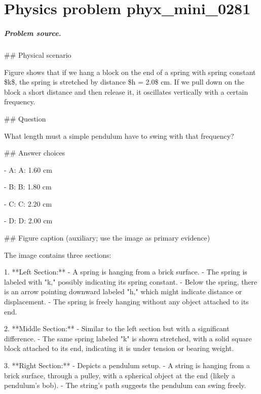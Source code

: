
\chapter{Physics problem phyx\_mini\_0281}
\label{ch:PhyXMiniProblems_problem_phyx_mini_0281}

\paragraph{Problem source.}
\#\# Physical scenario

Figure shows that if we hang a block on the end of a spring with spring constant \$k\$, the spring is stretched by distance \$h = 2.0\$ cm. If we pull down on the block a short distance and then release it, it oscillates vertically with a certain frequency.

\#\# Question

What length must a simple pendulum have to swing with that frequency?

\#\# Answer choices

- A: A: 1.60 cm

- B: B: 1.80 cm

- C: C: 2.20 cm

- D: D: 2.00 cm

\#\# Figure caption (auxiliary; use the image as primary evidence)

The image contains three sections:

1. **Left Section:**
   - A spring is hanging from a brick surface.
   - The spring is labeled with "k," possibly indicating its spring constant.
   - Below the spring, there is an arrow pointing downward labeled "h," which might indicate distance or displacement.
   - The spring is freely hanging without any object attached to its end.

2. **Middle Section:**
   - Similar to the left section but with a significant difference.
   - The same spring labeled "k" is shown stretched, with a solid square block attached to its end, indicating it is under tension or bearing weight.

3. **Right Section:**
   - Depicts a pendulum setup.
   - A string is hanging from a brick surface, through a pulley, with a spherical object at the end (likely a pendulum's bob).
   - The string's path suggests the pendulum can swing freely.

